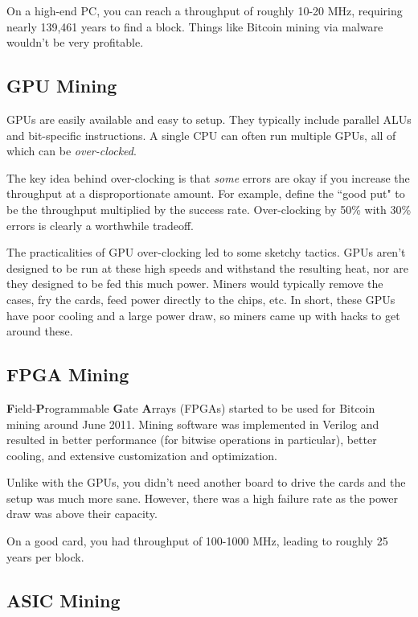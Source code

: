 \documentclass[12pt]{article}
\begin{document}
On a high-end PC, you can reach a throughput of roughly 10-20 MHz, requiring nearly 139,461 years to find a block. Things like Bitcoin mining via malware wouldn't be very profitable.

\subsection*{GPU Mining}

GPUs are easily available and easy to setup. They typically include parallel ALUs and bit-specific instructions. A single CPU can often run multiple GPUs, all of which can be \textit{over-clocked}.

The key idea behind over-clocking is that \textit{some} errors are okay if you increase the throughput at a disproportionate amount. For example, define the ``good put" to be the throughput multiplied by the success rate. Over-clocking by 50\% with 30\% errors is clearly a worthwhile tradeoff.

The practicalities of GPU over-clocking led to some sketchy tactics. GPUs aren't designed to be run at these high speeds and withstand the resulting heat, nor are they designed to be fed this much power. Miners would typically remove the cases, fry the cards, feed power directly to the chips, etc. In short, these GPUs have poor cooling and a large power draw, so miners came up with hacks to get around these.

\subsection*{FPGA Mining}

\textbf{F}ield-\textbf{P}rogrammable \textbf{G}ate \textbf{A}rrays (FPGAs) started to be used for Bitcoin mining around June 2011. Mining software was implemented in Verilog and resulted in better performance (for bitwise operations in particular), better cooling, and extensive customization and optimization.

Unlike with the GPUs, you didn't need another board to drive the cards and the setup was much more sane. However, there was a high failure rate as the power draw was above their capacity.

On a good card, you had throughput of 100-1000 MHz, leading to roughly 25 years per block.

\subsection*{ASIC Mining}
\end{document}
